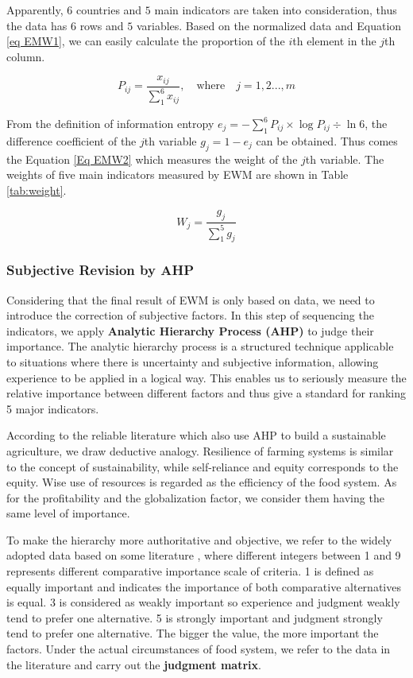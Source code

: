 \documentclass{mcmthesis}
\begin{document}
Apparently, $6$ countries and $5$ main indicators are taken into consideration, thus the data has $6$ rows and $5$ variables. Based on the normalized data and Equation \ref{eq EMW1}, we can easily calculate the proportion of the $i$th element in the $j$th column.

\begin{equation}
\label{eq EMW1}
P_{ij}=\frac{x_{ij}}{\sum_1^6{x_{ij}}},
\quad \text{where} \quad j=1,2...,m
\end{equation}

From the definition of information entropy $e_j=-\sum_1^6{P_{ij}}\times \log P_{ij}\div \ln 6$, the difference coefficient of the $j$th variable $g_j=1-e_j$ can be obtained. Thus comes the Equation \ref{Eq EMW2} which measures the weight of the $j$th variable. The weights of five main indicators measured by EWM are shown in Table \ref{tab:weight}.

\begin{equation}
\label{Eq EMW2}
W_j=\frac{g_j}{\sum_1^5{g_j}}
\end{equation}

\subsubsection{Subjective Revision by AHP }
\label{Sec-AHP}
Considering that the final result of EWM  is only based on data, we need to introduce the correction of subjective factors. In this step of sequencing the indicators, we apply \textbf{Analytic Hierarchy Process (AHP)} to judge their importance. The analytic hierarchy process is a structured technique applicable to situations where there is uncertainty and subjective information, allowing experience to be applied in a logical way. This enables us to seriously measure the relative importance between different factors and thus give a standard for ranking 5 major indicators.

According to the reliable literature \cite{AHP} which also use AHP to build a sustainable agriculture, we draw deductive analogy. Resilience of farming systems  is similar to the concept of sustainability, while self-reliance and equity corresponds to the equity. Wise use of resources is regarded as the efficiency of the food system. As for the profitability and the globalization factor, we consider them having the same level of importance. 

To make the hierarchy more authoritative and objective, we refer to the widely adopted data based on some literature \cite{AHPjudge}, where different integers between 1 and 9 represents different comparative importance scale of criteria. 1 is defined as equally important and indicates the importance of both comparative alternatives is equal. 3 is considered as weakly important so experience and judgment weakly tend to prefer one alternative. 5 is strongly important and judgment strongly tend to prefer one alternative. The bigger the value, the more important the factors. Under the actual circumstances of food system, we refer to the data in the literature and carry out the \textbf{judgment matrix}. 
\end{document}
